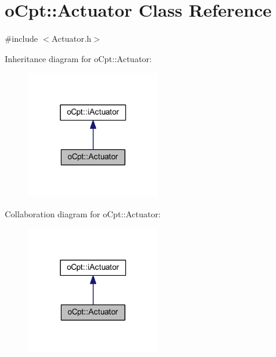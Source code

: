\hypertarget{classo_cpt_1_1_actuator}{}\section{o\+Cpt\+:\+:Actuator Class Reference}
\label{classo_cpt_1_1_actuator}


{\ttfamily \#include $<$Actuator.\+h$>$}



Inheritance diagram for o\+Cpt\+:\+:Actuator\+:
\nopagebreak
\begin{figure}[H]
\begin{center}
\leavevmode
\includegraphics[width=162pt]{classo_cpt_1_1_actuator__inherit__graph}
\end{center}
\end{figure}


Collaboration diagram for o\+Cpt\+:\+:Actuator\+:
\nopagebreak
\begin{figure}[H]
\begin{center}
\leavevmode
\includegraphics[width=162pt]{classo_cpt_1_1_actuator__coll__graph}
\end{center}
\end{figure}
